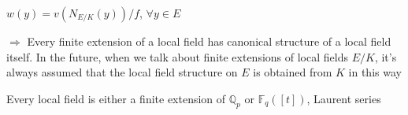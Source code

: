 \documentclass[main]{subfiles}
\begin{document}
\begin{remark}
$w(y)=v(N_{E/K}(y))/f$, $\forall y\in E$
\end{remark}

$\Rightarrow$ Every finite extension of a local field has canonical structure of a local field itself. In the future, when we talk about finite extensions of local fields $E/K$, it's always assumed that the local field structure on $E$ is obtained from $K$ in this way

\begin{fact}
Every local field is either a finite extension of $\mathbb Q_p$ or $\mathbb F_q([t])$, Laurent series
\end{fact}
\end{document}
